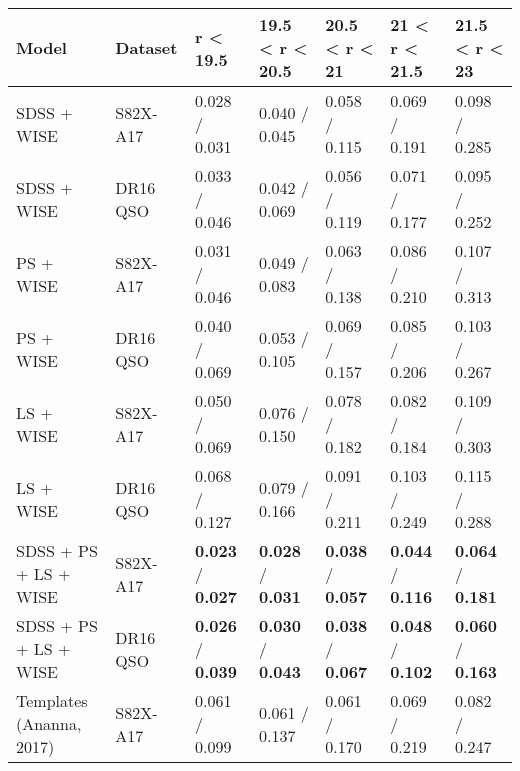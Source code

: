 \begin{table*}
    \centering
    \begin{tabular}{lllllll}
    \hline
                        Model &   Dataset &                         r < 19.5 &                  19.5 < r < 20.5 &                    20.5 < r < 21 &                    21 < r < 21.5 &                    21.5 < r < 23 \\
    \hline
                  SDSS + WISE &  S82X-A17 &                    0.028 / 0.031 &                    0.040 / 0.045 &                    0.058 / 0.115 &                    0.069 / 0.191 &                    0.098 / 0.285 \\
                  SDSS + WISE &  DR16 QSO &                    0.033 / 0.046 &                    0.042 / 0.069 &                    0.056 / 0.119 &                    0.071 / 0.177 &                    0.095 / 0.252 \\
                    PS + WISE &  S82X-A17 &                    0.031 / 0.046 &                    0.049 / 0.083 &                    0.063 / 0.138 &                    0.086 / 0.210 &                    0.107 / 0.313 \\
                    PS + WISE &  DR16 QSO &                    0.040 / 0.069 &                    0.053 / 0.105 &                    0.069 / 0.157 &                    0.085 / 0.206 &                    0.103 / 0.267 \\
                    LS + WISE &  S82X-A17 &                    0.050 / 0.069 &                    0.076 / 0.150 &                    0.078 / 0.182 &                    0.082 / 0.184 &                    0.109 / 0.303 \\
                    LS + WISE &  DR16 QSO &                    0.068 / 0.127 &                    0.079 / 0.166 &                    0.091 / 0.211 &                    0.103 / 0.249 &                    0.115 / 0.288 \\
        SDSS + PS + LS + WISE &  S82X-A17 &  \textbf{0.023} / \textbf{0.027} &  \textbf{0.028} / \textbf{0.031} &  \textbf{0.038} / \textbf{0.057} &  \textbf{0.044} / \textbf{0.116} &  \textbf{0.064} / \textbf{0.181} \\
        SDSS + PS + LS + WISE &  DR16 QSO &  \textbf{0.026} / \textbf{0.039} &  \textbf{0.030} / \textbf{0.043} &  \textbf{0.038} / \textbf{0.067} &  \textbf{0.048} / \textbf{0.102} &  \textbf{0.060} / \textbf{0.163} \\
     Templates (Ananna, 2017) &  S82X-A17 &                    0.061 / 0.099 &                    0.061 / 0.137 &                    0.061 / 0.170 &                    0.069 / 0.219 &                    0.082 / 0.247 \\

\end{tabular}
\end{table*}
